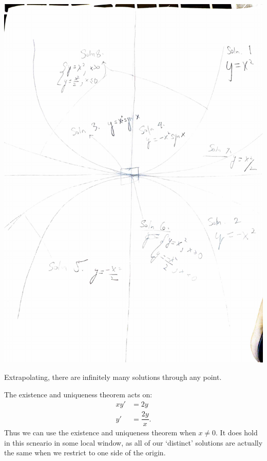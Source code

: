 \documentclass{article}
\begin{document}
    \newpage
    \begin{solution}[Solution 1b]
        \hfill \break
        \begin{center}
            \includegraphics[scale=0.5]{images/1/B.pdf}
        \end{center}
        Extrapolating, there are infinitely many solutions through any point.
    \end{solution}
    \begin{solution}[Solution 1c]
        The existence and uniqueness theorem acts on:
        \begin{align*}
            xy' &= 2y \\ 
            y' &= \dfrac{2y}{x}.
        \end{align*}
        Thus we can use the existence and uniqueness theorem when $x \ne 0$. It does hold in this scneario in some local window, as all of our `distinct' solutions 
        are actually the same when we restrict to one side of the origin.
    \end{solution}
\end{document}
